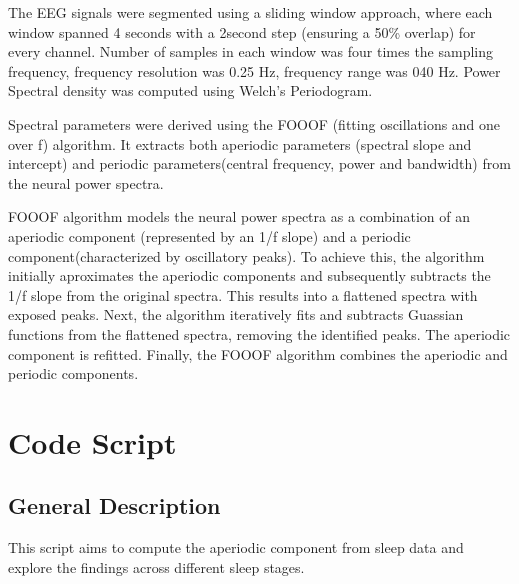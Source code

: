 \documentclass[letterpaper,10pt,english]{sphinxmanual}
\begin{document}
\sphinxAtStartPar
The EEG signals were segmented using a sliding window approach, where each window spanned 4 seconds with a 2\sphinxhyphen{}second step (ensuring a 50\% overlap) for every channel. Number of samples in each window was four times the sampling frequency, frequency resolution was 0.25 Hz, frequency range was 0\sphinxhyphen{}40 Hz. Power Spectral density was computed using Welch’s Periodogram.

\sphinxAtStartPar
Spectral parameters were derived using the FOOOF (fitting oscillations and one over f) algorithm. It extracts both aperiodic parameters (spectral slope and intercept) and periodic parameters(central frequency, power and bandwidth) from the neural power spectra.

\sphinxAtStartPar
FOOOF algorithm models the neural power spectra as a combination of an aperiodic component (represented by an 1/f slope) and a periodic component(characterized by oscillatory peaks). To achieve this, the algorithm initially aproximates the aperiodic components and subsequently subtracts the 1/f slope from the original spectra. This results into a flattened spectra with exposed peaks.
Next, the algorithm iteratively fits and subtracts Guassian functions from the flattened spectra, removing the identified peaks. The aperiodic component is refitted. Finally, the FOOOF algorithm combines the aperiodic and periodic components.


\chapter{Code Script}
\label{\detokenize{code:code-script}}\label{\detokenize{code::doc}}

\section{General Description}
\label{\detokenize{code:general-description}}
\sphinxAtStartPar
This script aims to compute the aperiodic component from sleep data and explore the findings across different sleep stages.
\end{document}
